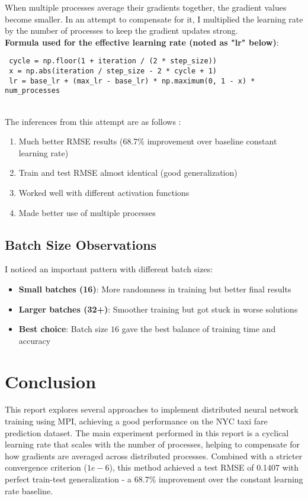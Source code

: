 \documentclass{article}
\begin{document}
When multiple processes average their gradients together, the gradient values become smaller. In an attempt to compensate for it, I multiplied the learning rate by the number of processes to keep the gradient updates strong.\\

\textbf{Formula used for the effective learning rate (noted as "lr" below)}:
\begin{lstlisting}
 cycle = np.floor(1 + iteration / (2 * step_size))
 x = np.abs(iteration / step_size - 2 * cycle + 1)
 lr = base_lr + (max_lr - base_lr) * np.maximum(0, 1 - x) * num_processes
\end{lstlisting} \\

The inferences from this attempt are as follows :
\begin{enumerate}
    \item Much better RMSE results (68.7\% improvement over baseline constant learning rate)
    \item Train and test RMSE almost identical (good generalization)  
    \item Worked well with different activation functions
    \item Made better use of multiple processes
\end{enumerate}

\subsection{Batch Size Observations}
I noticed an important pattern with different batch sizes:

\begin{itemize}
    \item \textbf{Small batches (16)}: More randomness in training but better final results
    \item \textbf{Larger batches (32+)}: Smoother training but got stuck in worse solutions
    \item \textbf{Best choice}: Batch size $16$ gave the best balance of training time and accuracy
\end{itemize}

\section{Conclusion}

This report explores several approaches to implement distributed neural network training using MPI, achieving a good performance on the NYC taxi fare prediction dataset. The main experiment performed in this report is a cyclical learning rate that scales with the number of processes, helping to compensate for how gradients are averaged across distributed processes. Combined with a stricter convergence criterion ($1e-6$), this method achieved a test RMSE of 0.1407 with perfect train-test generalization - a $68.7$\% improvement over the constant learning rate baseline.
\end{document}
